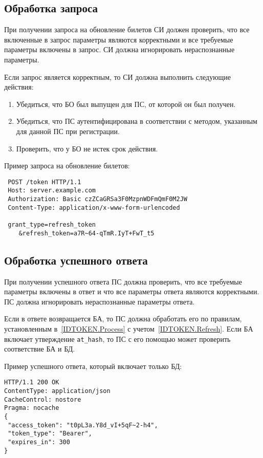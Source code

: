 \label{REQRESP.Refresh}

\subsection{Обработка запроса}\label{REQRESP.Refresh.Req}

При получении запроса на обновление билетов СИ должен проверить, что все 
включенные в запрос параметры являются корректными и все требуемые параметры 
включены в запрос.
%
СИ должна игнорировать нераспознанные параметры.

Если запрос является корректным, то СИ должна выполнить следующие действия:
\begin{enumerate}
\item 
Убедиться, что БО был выпущен для ПС, от которой он был получен.

\item 
Убедиться, что ПС аутентифицирована в соответствии с методом, указанным 
для данной ПС при регистрации.

\item 
Проверить, что у БО не истек срок действия.
\end{enumerate}

Пример запроса на обновление билетов:
\begin{lstlisting}
 POST /token HTTP/1.1
 Host: server.example.com
 Authorization: Basic czZCaGRSa3F0MzpnWDFmQmF0M2JW
 Content-Type: application/x-www-form-urlencoded

 grant_type=refresh_token
    &refresh_token=a7R~64-qTmR.IyT+FwT_t5
\end{lstlisting}

\subsection{Обработка успешного ответа}\label{REQRESP.Refresh.Resp}

При получении успешного ответа ПС должна проверить, что все
требуемые параметры включены в ответ и что все параметры ответа являются
корректными. ПС должна игнорировать нераспознанные параметры ответа.

Если в ответе возвращается БА, то ПС должна обработать его по правилам, 
установленным в~\ref{IDTOKEN.Process} с учетом~\ref{IDTOKEN.Refresh}. 
%
Если БА включает утверждение \lstinline{at_hash}, то ПС с его помощью 
может проверить соответствие БА и БД.

Пример успешного ответа, который включает только БД:
%
\begin{lstlisting}
HTTP/1.1 200 OK
ContentType: application/json
CacheControl: nostore
Pragma: nocache
{
 "access_token": "t0pL3a.Y8d_vI+5qF~2-h4",
 "token_type": "Bearer",
 "expires_in": 300
}
\end{lstlisting}

